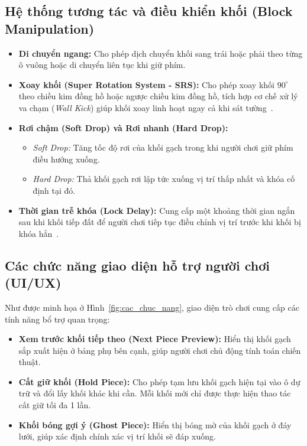 \subsection{Hệ thống tương tác và điều khiển khối (Block Manipulation)}
\begin{itemize}
    \item \textbf{Di chuyển ngang:} Cho phép dịch chuyển khối sang trái hoặc phải theo từng ô vuông hoặc di chuyển liên tục khi giữ phím.
    \item \textbf{Xoay khối (Super Rotation System - SRS):} Cho phép xoay khối $90^\circ$ theo chiều kim đồng hồ hoặc ngược chiều kim đồng hồ, tích hợp cơ chế xử lý va chạm (\textit{Wall Kick}) giúp khối xoay linh hoạt ngay cả khi sát tường~\cite{tetris_guideline}.
    \item \textbf{Rơi chậm (Soft Drop) và Rơi nhanh (Hard Drop):} 
    \begin{itemize}
        \item \textit{Soft Drop:} Tăng tốc độ rơi của khối gạch trong khi người chơi giữ phím điều hướng xuống.
        \item \textit{Hard Drop:} Thả khối gạch rơi lập tức xuống vị trí thấp nhất và khóa cố định tại đó.
    \end{itemize}
    \item \textbf{Thời gian trễ khóa (Lock Delay):} Cung cấp một khoảng thời gian ngắn sau khi khối tiếp đất để người chơi tiếp tục điều chỉnh vị trí trước khi khối bị khóa hẳn~\cite{tetris_lock}.
\end{itemize}

\subsection{Các chức năng giao diện hỗ trợ người chơi (UI/UX)}
Như được minh họa ở Hình~\ref{fig:cac_chuc_nang}, giao diện trò chơi cung cấp các tính năng bổ trợ quan trọng:
\begin{itemize}
    \item \textbf{Xem trước khối tiếp theo (Next Piece Preview):} Hiển thị khối gạch sắp xuất hiện ở bảng phụ bên cạnh, giúp người chơi chủ động tính toán chiến thuật.
    \item \textbf{Cất giữ khối (Hold Piece):} Cho phép tạm lưu khối gạch hiện tại vào ô dự trữ và đổi lấy khối khác khi cần. Mỗi khối mới chỉ được thực hiện thao tác cất giữ tối đa 1 lần.
    \item \textbf{Khối bóng gợi ý (Ghost Piece):} Hiển thị bóng mờ của khối gạch ở đáy lưới, giúp xác định chính xác vị trí khối sẽ đáp xuống.
\end{itemize}

